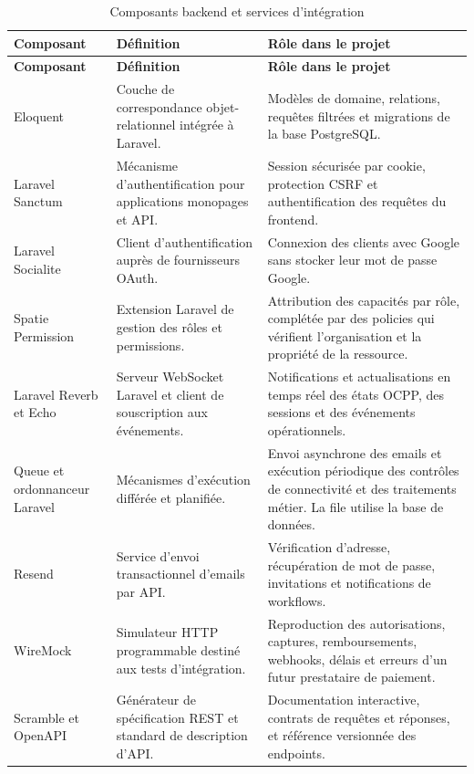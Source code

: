 \begin{longtable}{|p{3.0cm}|p{4.5cm}|p{6.5cm}|}
  \caption{Composants backend et services d'intégration}
  \label{tab:backend-services}\\
  \hline
  \rowcolor{ctmint}
  \textbf{Composant} & \textbf{Définition} & \textbf{Rôle dans le projet}\\\hline
  \endfirsthead
  \hline
  \rowcolor{ctmint}
  \textbf{Composant} & \textbf{Définition} & \textbf{Rôle dans le projet}\\\hline
  \endhead
  Eloquent &
  Couche de correspondance objet-relationnel intégrée à Laravel. &
  Modèles de domaine, relations, requêtes filtrées et migrations de la base
  PostgreSQL.\\\hline
  Laravel Sanctum &
  Mécanisme d'authentification pour applications monopages et API. &
  Session sécurisée par cookie, protection CSRF et authentification des
  requêtes du frontend.\\\hline
  Laravel Socialite &
  Client d'authentification auprès de fournisseurs OAuth. &
  Connexion des clients avec Google sans stocker leur mot de passe Google.\\\hline
  Spatie Permission &
  Extension Laravel de gestion des rôles et permissions. &
  Attribution des capacités par rôle, complétée par des policies qui vérifient
  l'organisation et la propriété de la ressource.\\\hline
  Laravel Reverb et Echo &
  Serveur WebSocket Laravel et client de souscription aux événements. &
  Notifications et actualisations en temps réel des états OCPP, des sessions
  et des événements opérationnels.\\\hline
  Queue et ordonnanceur Laravel &
  Mécanismes d'exécution différée et planifiée. &
  Envoi asynchrone des emails et exécution périodique des contrôles de
  connectivité et des traitements métier. La file utilise la base de données.\\\hline
  Resend &
  Service d'envoi transactionnel d'emails par API. &
  Vérification d'adresse, récupération de mot de passe, invitations et
  notifications de workflows.\\\hline
  WireMock &
  Simulateur HTTP programmable destiné aux tests d'intégration. &
  Reproduction des autorisations, captures, remboursements, webhooks, délais et
  erreurs d'un futur prestataire de paiement.\\\hline
  Scramble et OpenAPI &
  Générateur de spécification REST et standard de description d'API. &
  Documentation interactive, contrats de requêtes et réponses, et référence
  versionnée des endpoints.\\\hline
\end{longtable}

